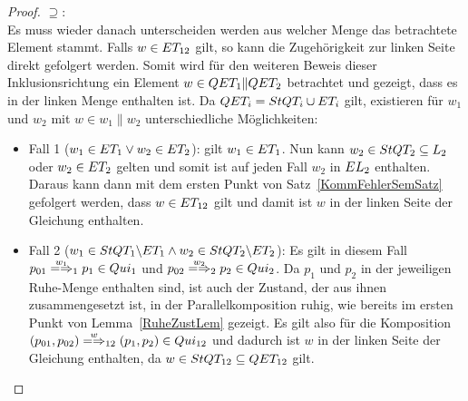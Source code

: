 \begin{proof}
  \glqq$\supseteq$\grqq{}:\\
  Es muss wieder danach unterscheiden werden aus welcher Menge das betrachtete
  Element stammt. Falls $w\in ET _{12}$ gilt, so kann die Zugehörigkeit zur
  linken Seite direkt gefolgert werden. Somit wird für den weiteren Beweis
  dieser Inklusionsrichtung ein Element $w\in QET _1\|QET _2$ betrachtet und
  gezeigt, dass es in der linken Menge enthalten ist. Da $QET _i=StQT _i\cup
  ET _i$ gilt, existieren für $w_1$ und $w_2$ mit $w\in w_1\|w_2$
  unterschiedliche Möglichkeiten:
  \begin{itemize}
    \item Fall 1 ($w_1\in ET _1\lor w_2\in ET _2$): \OBdA{} gilt $w_1\in ET
      _1$. Nun kann $w_2\in StQT _2\subseteq L_2$ oder $w_2\in ET _2$ gelten
      und somit ist auf jeden Fall $w_2$ in $EL _2$ enthalten. Daraus kann
      dann mit dem ersten Punkt von Satz~\ref{KommFehlerSemSatz} gefolgert
      werden, dass $w\in ET _{12}$ gilt und damit ist $w$ in der linken Seite
      der Gleichung enthalten.
    \item Fall 2 ($w_1\in StQT _1\backslash ET _1\land w_2\in StQT _2\backslash
      ET _2$): Es gilt in diesem Fall $p_{01} \weakmay[w_1]_1 p_1\in Qui_1$
      und $p_{02} \weakmay[w_2]_2 p_2\in Qui_2$. Da $p_1$ und $p_2$ in der
      jeweiligen Ruhe-Menge enthalten sind, ist auch der Zustand, der aus ihnen
      zusammengesetzt ist, in der Parallelkomposition ruhig, wie bereits im
      ersten Punkt von Lemma~\ref{RuheZustLem} gezeigt. Es gilt also für die
      Komposition $(p_{01},p_{02}) \weakmay[w]_{12} (p_1,p_2)\in Qui_{12}$ und
      dadurch ist $w$ in der linken Seite der Gleichung enthalten, da $w\in
      StQT _{12}\subseteq QET _{12}$ gilt.
  \end{itemize}
\end{proof}

